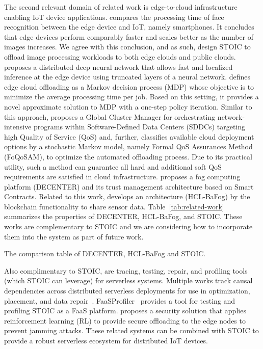 The second relevant domain of related work is edge-to-cloud infrastructure enabling IoT device applications. \cite{ref:face} compares the processing time of face recognition between the edge device and IoT, namely smartphones. It concludes that edge devices perform comparably faster and scales better as the number of images increases. We agree with this conclusion, and as such, design STOIC to offload image processing workloads to both edge clouds and public clouds. \cite{ref:DDNN} proposes a distributed deep neural network that allows fast and localized inference at the edge device using truncated layers of a neural network. \cite{ref:cooperative} defines edge cloud offloading as a Markov decision process (MDP) whose objective is to minimize the average processing time per job. Based on this setting, it provides a novel approximate solution to MDP with a one-step policy iteration. Similar to this approach, \cite{ref:QoS-aware} proposes a Global Cluster Manager for orchestrating network-intensive programs within Software-Defined Data Centers (SDDCs) targeting high Quality of Service (QoS) and, further, \cite{ref:FQoS} classifies available cloud deployment options by a stochastic Markov model, namely Formal QoS Assurances Method (FoQoSAM), to optimize the automated offloading process. Due to its practical utility, such a method can guarantee all hard and additional soft QoS requirements are satisfied in cloud infrastructure. \cite{ref:trust} proposes a fog computing platform (DECENTER) and its trust management architecture based on Smart Contracts. Related to this work, \cite{ref:multichain} develops an architecture (HCL-BaFog) by the blockchain functionality to share sensor data. Table~\ref{tab:related-work} summarizes the properties of DECENTER, HCL-BaFog, and STOIC. These works are complementary to STOIC and we are considering how to incorporate them into the system as part of future work.

\begin{table}
\centering
\resizebox{390pt}{!}{
}
\caption{ The comparison table of DECENTER, HCL-BaFog and STOIC.
\label{tab:related-work}}
\end{table}

Also complimentary to STOIC, are tracing, testing, repair, and profiling tools (which STOIC can leverage) for serverless systems. Multiple works track causal dependencies across distributed serverless deployments for use in optimization, placement, and data repair~\cite{ref:repairdata,deptracing19,gammaray17,aws-xray}. FaaSProfiler~\cite{ref:profile} provides a tool for testing and profiling STOIC as a FaaS platform. \cite{ref:security} proposes a security solution that applies reinforcement learning (RL) to provide secure offloading to the edge nodes to prevent jamming attacks. These related systems can be combined with STOIC to provide a robust serverless ecosystem for distributed IoT devices.
